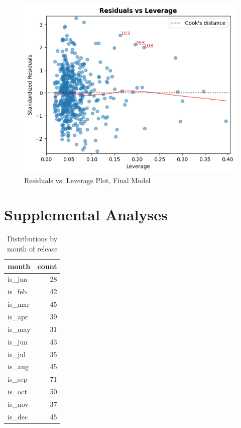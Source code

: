 \documentclass[10pt]{article}
\begin{document}
\begin{figure}[H]
\centering
	\centerline{\includegraphics[width=\columnwidth]{final_residuals_vs_leverage}}
	\caption{Residuals vs. Leverage Plot, Final Model\label{final_residuals_vs_leverage}}
\end{figure}



\section{Supplemental Analyses}

\begin{table}[H]
\centering
\caption{Distributions by month of release\label{month_distribution}}
\begin{tabular}{lr}
\toprule
month & count\\
\midrule
is\_jan & 28 \\
is\_feb & 42 \\
is\_mar & 45 \\
is\_apr & 39 \\
is\_may & 31 \\
is\_jun & 43 \\
is\_jul & 35 \\
is\_aug & 45 \\
is\_sep & 71 \\
is\_oct & 50 \\
is\_nov & 37 \\
is\_dec & 45 \\
\bottomrule
\end{tabular}
\end{table}
\end{document}
